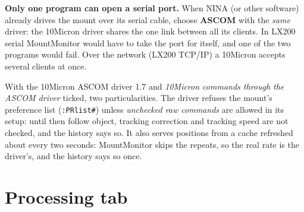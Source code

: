 \begin{warning}
\textbf{Only one program can open a serial port.} When NINA (or other
software) already drives the mount over its serial cable, choose
\textbf{ASCOM} with the \emph{same} driver: the 10Micron driver shares the one
link between all its clients. In LX200 serial MountMonitor would have to take
the port for itself, and one of the two programs would fail. Over the network
(LX200 TCP/IP) a 10Micron accepts several clients at once.
\end{warning}

With the 10Micron ASCOM driver 1.7 and \emph{10Micron commands through the
ASCOM driver} ticked, two particularities. The driver refuses the mount's
preference list (\texttt{:PRlist\#}) unless \emph{unchecked raw commands} are
allowed in its setup: until then follow object, tracking correction and
tracking speed are not checked, and the history says so. It also serves
positions from a cache refreshed about every two seconds: MountMonitor skips
the repeats, so the real rate is the driver's, and the history says so once.

\needspace{0.6\textheight}
\section{Processing tab}


